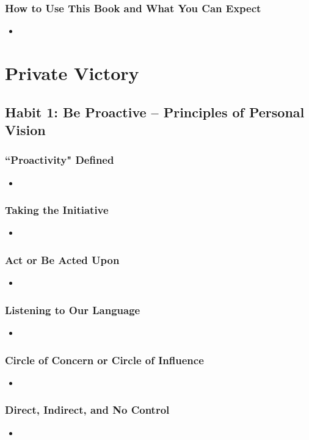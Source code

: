 \documentclass[11pt]{article}
\begin{document}
\subsubsection{How to Use This Book and What You Can Expect}
\begin{itemize}
\item 
\end{itemize}
\section{Private Victory}
\subsection{Habit 1: Be Proactive -- Principles of Personal Vision}
\subsubsection{``Proactivity" Defined}
\begin{itemize}
\item 
\end{itemize}
\subsubsection{Taking the Initiative}
\begin{itemize}
\item 
\end{itemize}
\subsubsection{Act or Be Acted Upon}
\begin{itemize}
\item 
\end{itemize}
\subsubsection{Listening to Our Language}
\begin{itemize}
\item 
\end{itemize}
\subsubsection{Circle of Concern or Circle of Influence}
\begin{itemize}
\item 
\end{itemize}
\subsubsection{Direct, Indirect, and No Control}
\begin{itemize}
\item 
\end{itemize}
\end{document}
